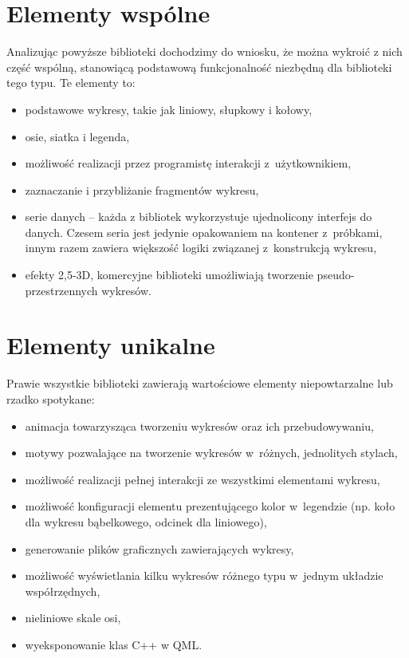 \section{Elementy wspólne}
Analizując powyższe biblioteki dochodzimy do wniosku, że można wykroić z nich część wspólną, stanowiącą podstawową funkcjonalność niezbędną dla biblioteki tego typu. Te elementy to:
\begin{itemize}
\item{podstawowe wykresy, takie jak liniowy, słupkowy i kołowy,}
\item{osie, siatka i legenda,}
\item{możliwość realizacji przez programistę interakcji z~użytkownikiem,}
\item{zaznaczanie i przybliżanie fragmentów wykresu,}
\item{serie danych -- każda z bibliotek wykorzystuje ujednolicony interfejs do danych. Czesem seria jest jedynie opakowaniem na kontener z~próbkami, innym razem zawiera większość logiki związanej z~konstrukcją wykresu,}
\item{efekty 2,5-3D, komercyjne biblioteki umożliwiają tworzenie pseudo-przestrzennych wykresów.}
\end{itemize}

\section{Elementy unikalne}
Prawie wszystkie biblioteki zawierają wartościowe elementy niepowtarzalne lub rzadko spotykane:
\begin{itemize}
\item{animacja towarzysząca tworzeniu wykresów oraz ich przebudowywaniu,}
\item{motywy pozwalające na tworzenie wykresów w~różnych, jednolitych stylach,}
\item{możliwość realizacji pełnej interakcji ze wszystkimi elementami wykresu,}
\item{możliwość konfiguracji elementu prezentującego kolor w~legendzie (np. koło dla wykresu bąbelkowego, odcinek dla liniowego),}
\item{generowanie plików graficznych zawierających wykresy,}
\item{możliwość wyświetlania kilku wykresów różnego typu w~jednym układzie współrzędnych,}
\item{nieliniowe skale osi,}
\item{wyeksponowanie klas C++ w QML.}
\end{itemize}


